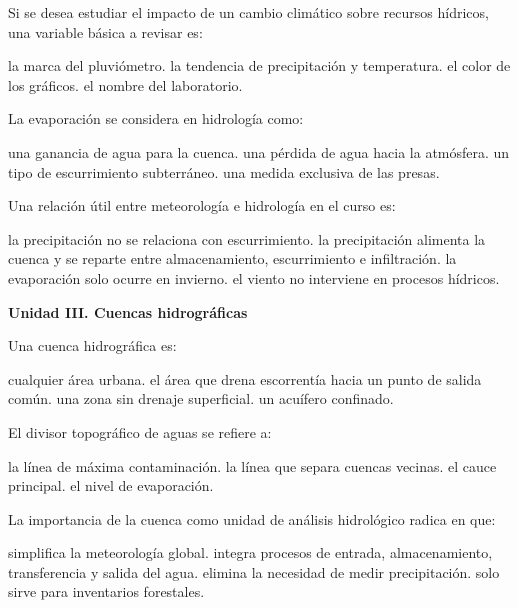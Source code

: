 \begin{questions}
\question[3] Si se desea estudiar el impacto de un cambio climático sobre
recursos hídricos, una variable básica a revisar es:
\begin{choices}
  \choice la marca del pluviómetro.
  \CorrectChoice la tendencia de precipitación y temperatura.
  \choice el color de los gráficos.
  \choice el nombre del laboratorio.
\end{choices}

\question[3] La evaporación se considera en hidrología como:
\begin{choices}
  \choice una ganancia de agua para la cuenca.
  \CorrectChoice una pérdida de agua hacia la atmósfera.
  \choice un tipo de escurrimiento subterráneo.
  \choice una medida exclusiva de las presas.
\end{choices}

\question[3] Una relación útil entre meteorología e hidrología en el
curso es:
\begin{choices}
  \choice la precipitación no se relaciona con escurrimiento.
  \CorrectChoice la precipitación alimenta la cuenca y se reparte entre almacenamiento, escurrimiento e infiltración.
  \choice la evaporación solo ocurre en invierno.
  \choice el viento no interviene en procesos hídricos.
\end{choices}

\item[]\textbf{Unidad III. Cuencas hidrográficas}\par\medskip

\question[3] Una cuenca hidrográfica es:
\begin{choices}
  \choice cualquier área urbana.
  \CorrectChoice el área que drena escorrentía hacia un punto de salida común.
  \choice una zona sin drenaje superficial.
  \choice un acuífero confinado.
\end{choices}

\question[3] El divisor topográfico de aguas se refiere a:
\begin{choices}
  \choice la línea de máxima contaminación.
  \CorrectChoice la línea que separa cuencas vecinas.
  \choice el cauce principal.
  \choice el nivel de evaporación.
\end{choices}

\question[3] La importancia de la cuenca como unidad de análisis
hidrológico radica en que:
\begin{choices}
  \choice simplifica la meteorología global.
  \CorrectChoice integra procesos de entrada, almacenamiento, transferencia y salida del agua.
  \choice elimina la necesidad de medir precipitación.
  \choice solo sirve para inventarios forestales.
\end{choices}


\end{questions}
